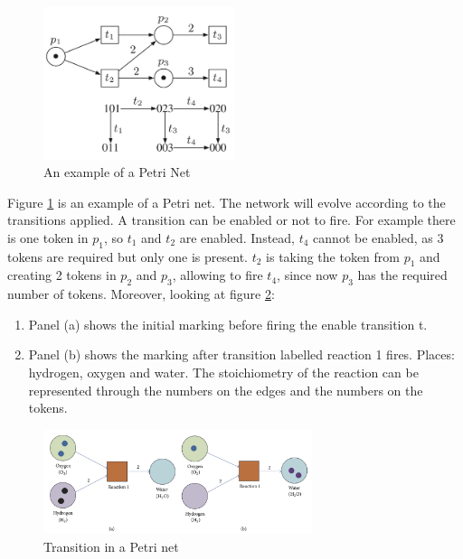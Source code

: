   \begin{figure}[H]
    \centering
    \includegraphics[width=0.5\textwidth]{petri_nets.png}
    \caption{An example of a Petri Net}
    \label{fig:petri}
  \end{figure}

  Figure \ref{fig:petri} is an example of a Petri net.
  The network will evolve according to the transitions applied.
  A transition can be enabled or not to fire.
  For example there is one token in \(p_1\), so \(t_1\) and \(t_2\) are enabled.
  Instead, \(t_4\) cannot be enabled, as 3 tokens are required but only one is present.
  \(t_2\) is taking the token from \(p_1\) and creating 2 tokens in \(p_2\) and \(p_3\), allowing to fire \(t_4\), since now \(p_3\) has the required number of tokens.
  Moreover, looking at figure \ref{fig:expetri}:

  \begin{multicols}{2}
    \begin{enumerate}
        \item Panel (a) shows the initial marking before firing the enable transition t.
        \item Panel (b) shows the marking after transition labelled reaction 1 fires.
          Places: hydrogen, oxygen and water.
          The stoichiometry of the reaction can be represented through the numbers on the edges and the numbers on the tokens.
    \end{enumerate}
  \end{multicols}

  \begin{figure}[H]
    \centering
    \includegraphics[width=0.7\textwidth]{example_petri.png}
    \caption{Transition in a Petri net}
    \label{fig:expetri}
  \end{figure}

